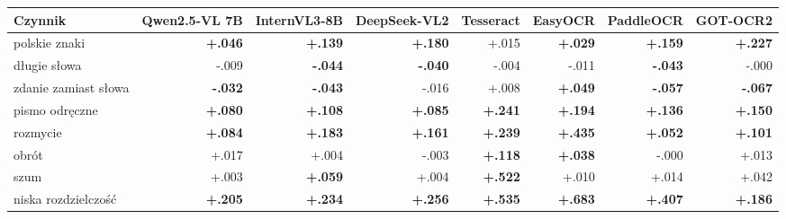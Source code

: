 \begin{tabular}{lrrrrrrr}
\toprule
Czynnik & Qwen2.5-VL 7B & InternVL3-8B & DeepSeek-VL2 & Tesseract & EasyOCR & PaddleOCR & GOT-OCR2 \\
\midrule
polskie znaki & \textbf{+.046} & \textbf{+.139} & \textbf{+.180} & +.015 & \textbf{+.029} & \textbf{+.159} & \textbf{+.227} \\
długie słowa & -.009 & \textbf{-.044} & \textbf{-.040} & -.004 & -.011 & \textbf{-.043} & -.000 \\
zdanie zamiast słowa & \textbf{-.032} & \textbf{-.043} & -.016 & +.008 & \textbf{+.049} & \textbf{-.057} & \textbf{-.067} \\
pismo odręczne & \textbf{+.080} & \textbf{+.108} & \textbf{+.085} & \textbf{+.241} & \textbf{+.194} & \textbf{+.136} & \textbf{+.150} \\
rozmycie & \textbf{+.084} & \textbf{+.183} & \textbf{+.161} & \textbf{+.239} & \textbf{+.435} & \textbf{+.052} & \textbf{+.101} \\
obrót & +.017 & +.004 & -.003 & \textbf{+.118} & \textbf{+.038} & -.000 & +.013 \\
szum & +.003 & \textbf{+.059} & +.004 & \textbf{+.522} & +.010 & +.014 & +.042 \\
niska rozdzielczość & \textbf{+.205} & \textbf{+.234} & \textbf{+.256} & \textbf{+.535} & \textbf{+.683} & \textbf{+.407} & \textbf{+.186} \\
\bottomrule
\end{tabular}
